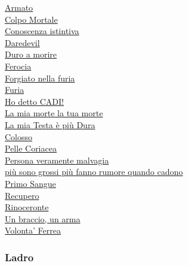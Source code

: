 \begin{multicols}{3}
{\begin{flushleft}
\hyperlink{Armato}{Armato}\\
\hyperlink{Colpo Mortale}{Colpo Mortale}\\
\hyperlink{Conoscenza istintiva}{Conoscenza istintiva}\\
\hyperlink{Daredevil}{Daredevil}\\
\hyperlink{Duro a morire}{Duro a morire}\\
\hyperlink{Ferocia}{Ferocia}\\
\hyperlink{Forgiato nella furia}{Forgiato nella furia}\\
\hyperlink{Furia}{Furia}\\
\hyperlink{Ho detto CADI!}{Ho detto CADI!}\\
\hyperlink{La mia morte la tua morte}{La mia morte la tua morte}\\
\hyperlink{La mia Testa è più Dura}{La mia Testa è più Dura}\\
\hyperlink{Colosso}{Colosso}\\
\hyperlink{Pelle Coriacea}{Pelle Coriacea}\\
\hyperlink{Persona veramente malvagia}{Persona veramente malvagia}\\
\hyperlink{più sono grossi più fanno rumore quando cadono}{più sono grossi più fanno rumore quando cadono}\\
\hyperlink{Primo Sangue}{Primo Sangue}\\
\hyperlink{Recupero}{Recupero}\\
\hyperlink{Rinoceronte}{Rinoceronte}\\
\hyperlink{Un braccio, un arma}{Un braccio, un arma}\\
\hyperlink{Volonta' Ferrea}{Volonta' Ferrea}

\titlespacing*{\subsubsection}{0pt}{0.5em}{0.5em}\subsubsection*{Ladro}


\end{flushleft}}
\end{multicols}
